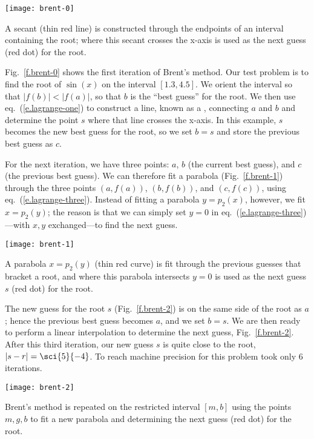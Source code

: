 \begin{marginfigure}[-12\baselineskip]
\texttt{[image: brent-0]}
\caption[Brent's method]{A secant (thin red line) is constructed through the endpoints of an interval containing the root; where this secant crosses the x-axis is used as the next guess (red dot) for the root.\label{f.brent-0}}
\end{marginfigure}
Fig.~\ref{f.brent-0} shows the first iteration of Brent's method. Our test problem is to find the root of $\sin(x)$ on the interval $[1.3,4.5]$. We orient the interval so that $|f(b)|<|f(a)|$, so that $b$ is the ``best guess'' for the root. We then use eq.~(\ref{e.lagrange-one}) to construct a line, known as a , connecting $a$ and $b$ and determine the point $s$ where that line crosses the x-axis. In this example, $s$ becomes the new best guess for the root, so we set $b=s$ and store the previous best guess as $c$.

For the next iteration, we have three points: $a$, $b$ (the current best guess), and $c$ (the previous best guess). We can therefore fit a parabola (Fig.~\ref{f.brent-1}) through the three points $(a,f(a))$, $(b,f(b))$, and $(c,f(c))$, using eq.~(\ref{e.lagrange-three}). Instead of fitting a parabola $y = p_{2}(x)$, however, we fit $x = p_{2}(y)$; the reason is that we can simply set $y=0$ in eq.~(\ref{e.lagrange-three})---with $x,y$ exchanged---to find the next guess.
\begin{marginfigure}[-8\baselineskip]
\texttt{[image: brent-1]}
\caption[Second iteration, Brent's method]{A parabola $x=p_{2}(y)$ (thin red curve) is fit through the previous guesses that bracket a root, and where this parabola intersects $y=0$ is used as the next guess $s$ (red dot) for the root.\label{f.brent-1}}
\end{marginfigure}

The new guess for the root $s$ (Fig.~\ref{f.brent-2}) is on the same side of the root as $a$; hence the previous best guess becomes $a$, and we set $b = s$. We are then ready to perform a linear interpolation to determine the next guess, Fig.~\ref{f.brent-2}. After this third iteration, our new guess $s$ is quite close to the root, $|s-r| = \sci{5}{-4}$. To reach machine precision for this problem took only 6 iterations.
\begin{marginfigure}
\texttt{[image: brent-2]}
\caption[Third iteration, Brent's method]{Brent's method is repeated on the restricted interval $[m,b]$ using the points $m,g,b$ to fit a new parabola and determining the next guess (red dot) for the root.\label{f.brent-2}}
\end{marginfigure}

